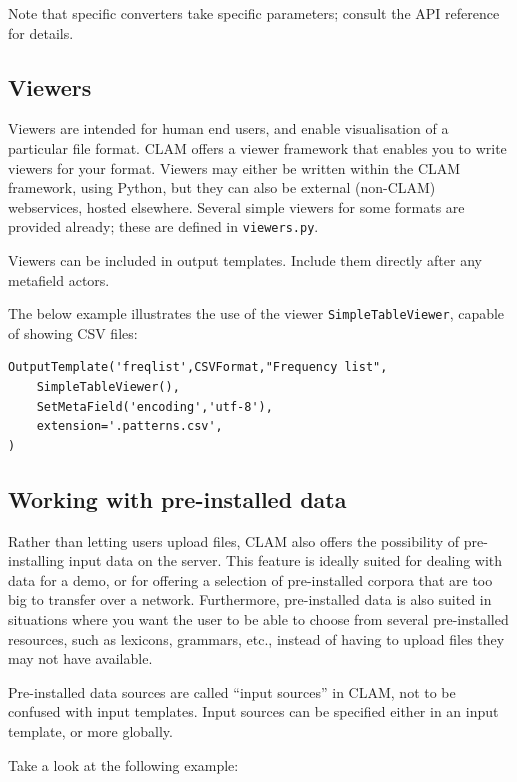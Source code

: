 \documentclass[a4paper,12pt,twoside,openright]{report}
\begin{document}
Note that specific converters take specific parameters; consult the API reference for details.


\subsection{Viewers}

Viewers are intended for human end users, and enable visualisation of a
particular file format. CLAM offers a viewer framework that enables you to
write viewers for your format. Viewers may either be written within the CLAM
framework, using Python, but they can also be external (non-CLAM) webservices,
hosted elsewhere. Several simple viewers for some formats are provided already;
these are defined in \texttt{viewers.py}.

Viewers can be included in output templates. Include them directly after any
metafield actors.


The below example illustrates the use of the viewer
\texttt{SimpleTableViewer}, capable of showing CSV files:

{ \small
\begin{verbatim}
OutputTemplate('freqlist',CSVFormat,"Frequency list",
    SimpleTableViewer(),
    SetMetaField('encoding','utf-8'),
    extension='.patterns.csv',
)
\end{verbatim}
}

\subsection{Working with pre-installed data}

Rather than letting users upload files, CLAM also offers the possibility of
pre-installing input data on the server. This feature is ideally suited for
dealing with data for a demo, or for offering a selection of pre-installed
corpora that are too big to transfer over a network. Furthermore, pre-installed
data is also suited in situations where you want the user to be able to choose
from several pre-installed resources, such as lexicons, grammars, etc., instead
of having to upload files they may not have available.

Pre-installed data sources are called ``input sources'' in CLAM, not to be
confused with input templates. Input sources can be specified either in an
input template, or more globally. 

Take a look at the following example:
\end{document}
